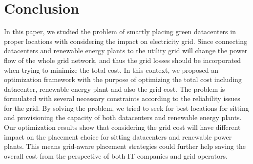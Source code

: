 \section{Conclusion}
\label{sec:conclusion}

In this paper, we studied the problem of smartly placing green datacenters in proper locations with considering the impact on electricity grid. Since connecting datacenters and renewable energy plants to the utility grid will change the power flow of the whole grid network, and thus the grid losses should be incorporated when trying to minimize the total cost. In this context, we proposed an optimization framework with the purpose of optimizing the total cost including datacenter, renewable energy plant and also the grid cost. The problem is formulated with several necessary constraints according to the reliability issues for the grid. By solving the problem, we tried to seek for best locations for sitting and provisioning the capacity of both datacenters and renewable energy plants. Our optimization results show that considering the grid cost will have different impact on the placement choice for sitting datacenters and renewable power plants. This means grid-aware placement strategies could further help saving the overall cost from the perspective of both IT companies and grid operators.

